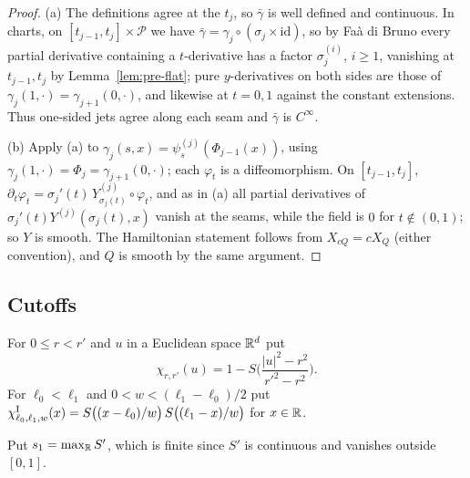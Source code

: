 \begin{proof}
(a) The definitions agree at the $t_j$, so $\bar\gamma$ is well defined and continuous. In charts, on $[t_{j-1},t_j]\times\mathcal P$ we have $\bar\gamma=\gamma_j\circ(\sigma_j\times\mathrm{id})$, so by Fa\`a di Bruno every partial derivative containing a $t$-derivative has a factor $\sigma_j^{(i)}$, $i\ge1$, vanishing at $t_{j-1},t_j$ by Lemma~\ref{lem:pre-flat}; pure $y$-derivatives on both sides are those of $\gamma_j(1,\cdot)=\gamma_{j+1}(0,\cdot)$, and likewise at $t=0,1$ against the constant extensions. Thus one-sided jets agree along each seam and $\bar\gamma$ is $C^\infty$.

(b) Apply (a) to $\gamma_j(s,x)=\psi^{(j)}_s(\Phi_{j-1}(x))$, using $\gamma_j(1,\cdot)=\Phi_j=\gamma_{j+1}(0,\cdot)$; each $\varphi_t$ is a diffeomorphism. On $[t_{j-1},t_j]$, $\partial_t\varphi_t=\sigma_j'(t)\,Y^{(j)}_{\sigma_j(t)}\circ\varphi_t$, and as in (a) all partial derivatives of $\sigma_j'(t)Y^{(j)}(\sigma_j(t),x)$ vanish at the seams, while the field is $0$ for $t\notin(0,1)$; so $Y$ is smooth. The Hamiltonian statement follows from $X_{cQ}=cX_Q$ (either convention), and $Q$ is smooth by the same argument.
\end{proof}

\subsection{Cutoffs}\label{sec:pre-cutoff}

\begin{definition}\label{def:pre-cutoff}
For $0\le r<r'$ and $u$ in a Euclidean space $\mathbb{R}^d$ put
\[
 \chi_{r,r'}(u)=1-S\Big(\frac{|u|^2-r^2}{r'^2-r^2}\Big).
\]
For $\ell_0<\ell_1$ and $0<w<(\ell_1-\ell_0)/2$ put
$\chi^{\rm I}_{\ell_0,\ell_1,w}(x)=S\big((x-\ell_0)/w\big)\,S\big((\ell_1-x)/w\big)$ for $x\in\mathbb{R}$.
\end{definition}

Put $s_1=\max_{\mathbb{R}}S'$, which is finite since $S'$ is continuous and vanishes outside $[0,1]$.

